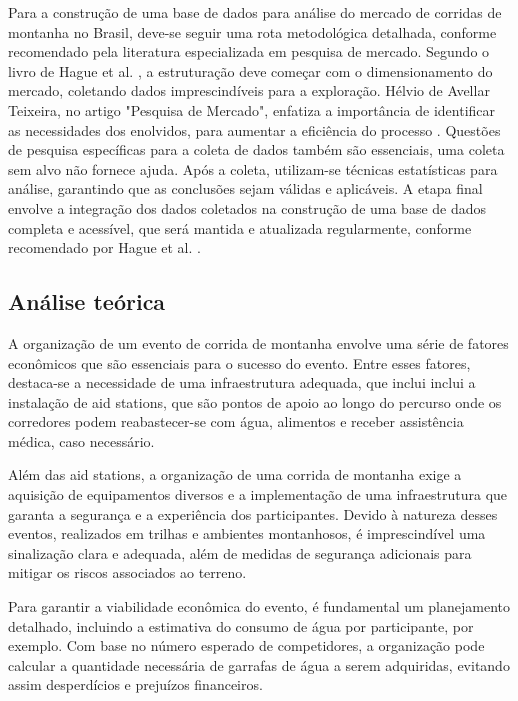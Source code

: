 Para a construção de uma base de dados para análise do mercado de corridas de montanha no Brasil, deve-se seguir uma rota metodológica detalhada, conforme recomendado pela literatura especializada em pesquisa de mercado. Segundo o livro de Hague et al. \cite{hague2021}, a estruturação deve começar com o dimensionamento do mercado, coletando dados imprescindíveis para a exploração. Hélvio de Avellar Teixeira, no artigo "Pesquisa de Mercado", enfatiza a importância de identificar as necessidades dos enolvidos, para aumentar a eficiência do processo \cite{teixeira2012}. Questões de pesquisa específicas para a coleta de dados também são essenciais, uma coleta sem alvo não fornece ajuda. Após a coleta, utilizam-se técnicas estatísticas para análise, garantindo que as conclusões sejam válidas e aplicáveis. A etapa final envolve a integração dos dados coletados na construção de uma base de dados completa e acessível, que será mantida e atualizada regularmente, conforme recomendado por Hague et al. \cite{hague2021}.

\subsection{Análise teórica}

A organização de um evento de corrida de
montanha envolve uma série de fatores econômicos
que são essenciais para o sucesso do evento.
Entre esses fatores, destaca-se a necessidade de
uma infraestrutura adequada, que inclui inclui a
instalação de aid stations, que são pontos de
apoio ao longo do percurso onde os corredores
podem reabastecer-se com água, alimentos e
receber assistência médica, caso necessário.

Além das aid stations, a organização de uma
corrida de montanha exige a aquisição de
equipamentos diversos e a implementação de uma
infraestrutura que garanta a segurança e a
experiência dos participantes. Devido à natureza
desses eventos, realizados em trilhas e
ambientes montanhosos, é imprescindível uma
sinalização clara e adequada, além de medidas de
segurança adicionais para mitigar os riscos
associados ao terreno.

Para garantir a viabilidade econômica do evento,
é fundamental um planejamento detalhado,
incluindo a estimativa do consumo de água por
participante, por exemplo. Com base no número
esperado de competidores, a organização pode
calcular a quantidade necessária de garrafas de
água a serem adquiridas, evitando assim
desperdícios e prejuízos financeiros.


